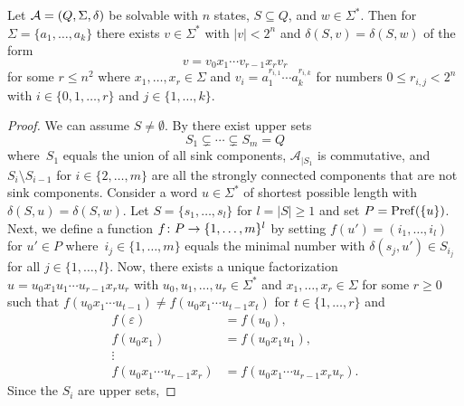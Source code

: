 \begin{proposition} \label{prop:S-T-bound}
	Let $\mathcal A = (Q, \Sigma, \delta)$ be solvable with $n$ states, $S \subseteq Q$,
	and $w \in \Sigma^*$.
	Then for $\Sigma = \{a_1, \ldots, a_k\}$
	there exists $v \in \Sigma^*$ with $|v| < 2^n$
	and $\delta(S, v) = \delta(S, w)$
	of the form
	\[ 
	v = v_0 x_1 \cdots v_{r-1} x_r v_r
	\]%
	for some $r \le n^2$
	where $x_1, \ldots, x_r \in \Sigma$ and $v_i = a_1^{r_{i,1}} \cdots a_k^{r_{i,k}}$
	for numbers $0 \le r_{i,j} < 2^n$
	with $i \in \{0,1,\ldots,r\}$ and $j \in \{1,\ldots,k\}$.
\end{proposition}
\begin{proof}
	We can assume $S \ne \emptyset$.
	By  
	there exist upper sets 
	\begin{equation}\label{eqn:S-T:sequence}
		S_1 \subsetneq \cdots \subsetneq S_m = Q
	\end{equation}
	where~$S_1$ equals the union of all sink components,
	$\mathcal A_{|S_1}$ is commutative, and $S_{i} \setminus S_{i-1}$ for $i \in \{2,\ldots,m\}$
	are all the strongly connected components that are not sink components.  
	Consider a word
	$u \in \Sigma^*$ of shortest possible
	length with $\delta(S, u) = \delta(S, w)$.
	Let $S = \{s_1, \ldots, s_l\}$ for $l = |S| \ge 1$
	and set $P = \operatorname{Pref}(\{u\})$.
	Next, we define a function $f \colon P \to \mathbb \{1,\ldots,m\}^l$ 
	by setting $f(u') = (i_1,\ldots,i_l)$  for $u' \in P$ 
	where~$i_j \in \{1,\ldots,m\}$ equals the minimal number with $\delta(s_j, u') \in S_{i_j}$
	for all $j \in \{1,\ldots,l\}$.
	Now, there exists a unique factorization $u = u_0 x_1 u_1 \cdots u_{r-1} x_r u_r$
	with  $u_0, u_1, \ldots, u_r \in \Sigma^*$
	and $x_1, \ldots, x_r \in \Sigma$ for some $r \ge 0$
	such that $f(u_0 x_1 \cdots u_{t-1}) \ne f(u_0 x_1 \cdots u_{t-1}x_t)$
	for $t \in \{1,\ldots,r\}$ and
	\begin{align*}
		f(\varepsilon) & = f(u_0), \\
		f(u_0x_1)      & = f(u_0x_1 u_1), \\
		\vdots \\
		f(u_0 x_1 \cdots u_{r-1} x_r) & = f(u_0 x_1 \cdots u_{r-1} x_r u_r).
	\end{align*}
	Since the $S_i$ are upper sets,

\end{proof}
